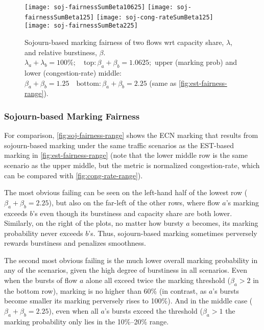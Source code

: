 \begin{figure*}
	\centering
	\texttt{[image: soj-fairnessSumBeta10625]}
	\texttt{[image: soj-fairnessSumBeta125]}
	\texttt{[image: soj-cong-rateSumBeta125]}
	\texttt{[image: soj-fairnessSumBeta225]}
	\caption{Sojourn-based marking fairness of two flows wrt capacity share, \(\lambda\), and relative burstiness, \(\beta\).\\
		\(\lambda_a+\lambda_b=100\%; \quad\mathrm{top:} \beta_a+\beta_b=1.0625;\) upper (marking prob) and lower (congestion-rate) middle: \(\beta_a+\beta_b=1.25 
		\quad\mathrm{bottom:} \beta_a+\beta_b=2.25\) (same as \autoref{fig:est-fairness-range}). 
}\label{fig:soj-fairness-range}
\end{figure*}

\subsubsection{Sojourn-based Marking Fairness}\label{sec:marking_fairness_expts_soj}

For comparison, \autoref{fig:soj-fairness-range} shows the ECN marking that results from sojourn-based marking under the same traffic scenarios as the EST-based marking in \autoref{fig:est-fairness-range} (note that the lower middle row is the same scenario as the upper middle, but the metric is normalized congestion-rate, which can be compared with \autoref{fig:cong-rate-range}).

The most obvious failing can be seen on the left-hand half of the lowest row (\(\beta_a+\beta_b=2.25\)), but also on the far-left of the other rows, where flow \(a\)'s marking exceeds \(b\)'s even though its burstiness and capacity share are both lower.
Similarly, on the right of the plots, no matter how bursty \(a\) becomes, its marking probability never exceeds \(b\)'s. Thus, sojourn-based marking sometimes perversely rewards burstiness and penalizes smoothness.

The second most obvious failing is the much lower overall marking probability in any of the scenarios, given the high degree of burstiness in all scenarios. Even when the bursts of flow \(a\) alone all exceed twice the marking threshold (\(\beta_a>2\) in the bottom row), marking is no higher than 60\% (in contrast, as  \(a\)'s bursts become smaller its marking perversely rises to 100\%). And in the middle case (\(\beta_a+\beta_b=2.25\)), even when all \(a\)'s bursts exceed the threshold (\(\beta_a>1\) the marking probability only lies in the 10\%--20\% range.

